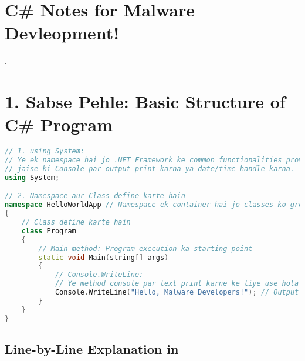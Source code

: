 \documentclass[12pt]{article}
\begin{document}
\section*{\textbf{C\# Notes for Malware Devleopment!}}
.



\section*{\textbf{1. Sabse Pehle: Basic Structure of C\# Program}}

\begin{lstlisting}[language=C++, caption=Basic Structure of C# Program]
// 1. using System:
// Ye ek namespace hai jo .NET Framework ke common functionalities provide karta hai,
// jaise ki Console par output print karna ya date/time handle karna.
using System;

// 2. Namespace aur Class define karte hain
namespace HelloWorldApp // Namespace ek container hai jo classes ko group karta hai.
{
    // Class define karte hain
    class Program
    {
        // Main method: Program execution ka starting point
        static void Main(string[] args) 
        {
            // Console.WriteLine:
            // Ye method console par text print karne ke liye use hota hai.
            Console.WriteLine("Hello, Malware Developers!"); // Output: Hello, Malware Developers!
        }
    }
}
\end{lstlisting}

\subsection*{Line-by-Line Explanation in  }
\end{document}
